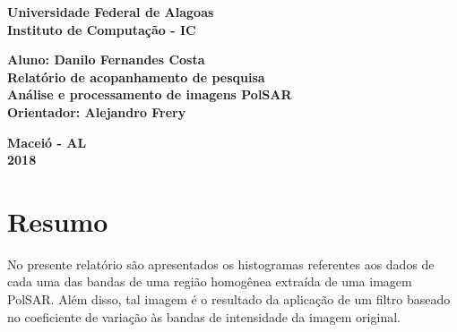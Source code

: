 \documentclass[12pt]{article}
\begin{document}
\begin{titlepage}
\begin{center}

\textbf{\LARGE Universidade Federal de Alagoas } \\[0.5cm]
\textbf{\large Instituto de Computação - IC}\\[0.2cm]

\vspace{20pt}

\vspace{20pt}
\vspace{20pt}
\vspace{20pt}
\vspace{20pt}
\vspace{20pt}
\vspace{20pt}
\vspace{20pt}
\vspace{20pt}

\textbf{\Large Aluno: Danilo Fernandes Costa}\\
\vspace{70pt}
\textbf{\LARGE Relatório de acopanhamento de pesquisa}\\
\vspace{20pt}
\textbf{\Large Análise e processamento de imagens PolSAR}\\
\vspace{70pt}
\textbf{\large Orientador: Alejandro Frery}\\

\vspace{45pt}
\end{center}

\par
\vfill
\begin{center}
\textbf{Maceió - AL}\\
\textbf{2018}
\end{center}

\end{titlepage}

\newpage

\section{Resumo}

No presente relatório são apresentados os histogramas referentes aos dados de cada uma das bandas de uma região homogênea extraída de uma imagem PolSAR. Além disso, tal imagem é o resultado da aplicação de um filtro baseado no coeficiente de variação às bandas de intensidade da imagem original.  
\end{document}
